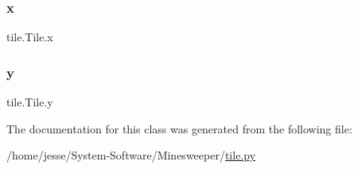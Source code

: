 \mbox{\label{classtile_1_1_tile_a3d5f111dcaf01ba902df52f85ee50318}} 
\subsubsection{\texorpdfstring{x}{x}}
{\footnotesize\ttfamily tile.\+Tile.\+x}

\mbox{\label{classtile_1_1_tile_aea02ac6a7bbed9aacf20d5db108f3006}} 
\subsubsection{\texorpdfstring{y}{y}}
{\footnotesize\ttfamily tile.\+Tile.\+y}



The documentation for this class was generated from the following file\+:\begin{DoxyCompactItemize}
\item 
/home/jesse/\+System-\/\+Software/\+Minesweeper/\mbox{\hyperlink{tile_8py}{tile.\+py}}\end{DoxyCompactItemize}
